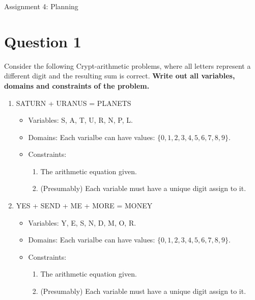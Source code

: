 \documentclass[11pt]{article}
\begin{document}
\begin{flushleft}
Assignment 4: Planning

\section*{Question 1}

Consider the following Crypt-arithmetic problems, where all letters represent a
different digit and the resulting sum is correct. \textbf{Write out all
variables, domains and constraints of the problem.}

    \begin{enumerate}[label=(\alph*)]
        \itemsep1em
        \item SATURN + URANUS = PLANETS
            \begin{itemize}
                \itemsep1em
                \item Variables: S, A, T, U, R, N, P, L.
                \item Domains: Each varialbe can have values: $\{0, 1, 2, 3, 4,
                    5, 6, 7, 8, 9\}$.
                \item Constraints:
                    \begin{enumerate}[label=\arabic*.]
                        \item The arithmetic equation given.
                        \item (Presumably) Each variable must have a unique
                            digit assign to it.
                    \end{enumerate}
            \end{itemize}
        \item YES + SEND + ME + MORE = MONEY
            \begin{itemize}
                \itemsep1em
                \item Variables: Y, E, S, N, D, M, O, R.
                \item Domains: Each varialbe can have values: $\{0, 1, 2, 3, 4,
                    5, 6, 7, 8, 9\}$.
                \item Constraints:
                    \begin{enumerate}[label=\arabic*.]
                        \item The arithmetic equation given.
                        \item (Presumably) Each variable must have a unique
                            digit assign to it.
                    \end{enumerate}
            \end{itemize}
    \end{enumerate}


\end{flushleft}
\end{document}
